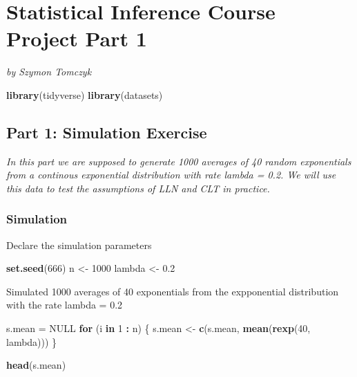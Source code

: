 \documentclass[]{article}
\author{}
\date{\vspace{-2.5em}}
\newenvironment{Shaded}{\begin{snugshade}}{\end{snugshade}}
\newcommand{\ControlFlowTok}[1]{\textcolor[rgb]{0.13,0.29,0.53}{\textbf{#1}}}
\newcommand{\DecValTok}[1]{\textcolor[rgb]{0.00,0.00,0.81}{#1}}
\newcommand{\FloatTok}[1]{\textcolor[rgb]{0.00,0.00,0.81}{#1}}
\newcommand{\KeywordTok}[1]{\textcolor[rgb]{0.13,0.29,0.53}{\textbf{#1}}}
\newcommand{\NormalTok}[1]{#1}
\newcommand{\OperatorTok}[1]{\textcolor[rgb]{0.81,0.36,0.00}{\textbf{#1}}}
\newcommand{\OtherTok}[1]{\textcolor[rgb]{0.56,0.35,0.01}{#1}}
\newcommand{\StringTok}[1]{\textcolor[rgb]{0.31,0.60,0.02}{#1}}
\begin{document}
\hypertarget{statistical-inference-course-project-part-1}{%
\section{Statistical Inference Course Project Part
1}\label{statistical-inference-course-project-part-1}}

\emph{by Szymon Tomczyk}

\begin{Shaded}
\begin{Highlighting}[]
\KeywordTok{library}\NormalTok{(tidyverse)}
\KeywordTok{library}\NormalTok{(datasets)}
\end{Highlighting}
\end{Shaded}

\hypertarget{part-1-simulation-exercise}{%
\subsection{Part 1: Simulation
Exercise}\label{part-1-simulation-exercise}}

\emph{In this part we are supposed to generate 1000 averages of 40
random exponentials from a continous exponential distribution with rate
lambda = 0.2. We will use this data to test the assumptions of LLN and
CLT in practice.}

\hypertarget{simulation}{%
\subsubsection{Simulation}\label{simulation}}

Declare the simulation parameters

\begin{Shaded}
\begin{Highlighting}[]
\KeywordTok{set.seed}\NormalTok{(}\DecValTok{666}\NormalTok{)}
\NormalTok{n <-}\StringTok{ }\DecValTok{1000}
\NormalTok{lambda <-}\StringTok{ }\FloatTok{0.2}
\end{Highlighting}
\end{Shaded}

Simulated 1000 averages of 40 exponentials from the expponential
distribution with the rate lambda = 0.2

\begin{Shaded}
\begin{Highlighting}[]
\NormalTok{s.mean =}\StringTok{ }\OtherTok{NULL}
\ControlFlowTok{for}\NormalTok{ (i }\ControlFlowTok{in} \DecValTok{1} \OperatorTok{:}\StringTok{ }\NormalTok{n) \{ s.mean <-}\StringTok{ }\KeywordTok{c}\NormalTok{(s.mean, }\KeywordTok{mean}\NormalTok{(}\KeywordTok{rexp}\NormalTok{(}\DecValTok{40}\NormalTok{, lambda))) \}}

\KeywordTok{head}\NormalTok{(s.mean)}
\end{Highlighting}
\end{Shaded}
\end{document}
